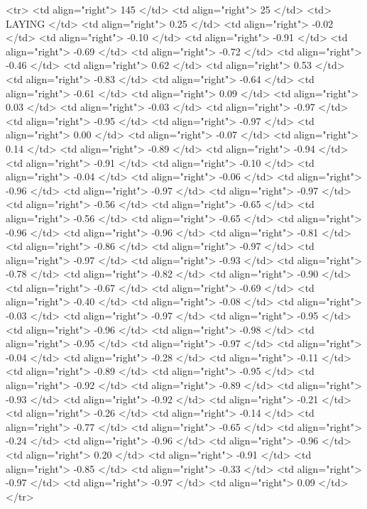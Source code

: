   <tr> <td align="right"> 145 </td> <td align="right">  25 </td> <td> LAYING </td> <td align="right"> 0.25 </td> <td align="right"> -0.02 </td> <td align="right"> -0.10 </td> <td align="right"> -0.91 </td> <td align="right"> -0.69 </td> <td align="right"> -0.72 </td> <td align="right"> -0.46 </td> <td align="right"> 0.62 </td> <td align="right"> 0.53 </td> <td align="right"> -0.83 </td> <td align="right"> -0.64 </td> <td align="right"> -0.61 </td> <td align="right"> 0.09 </td> <td align="right"> 0.03 </td> <td align="right"> -0.03 </td> <td align="right"> -0.97 </td> <td align="right"> -0.95 </td> <td align="right"> -0.97 </td> <td align="right"> 0.00 </td> <td align="right"> -0.07 </td> <td align="right"> 0.14 </td> <td align="right"> -0.89 </td> <td align="right"> -0.94 </td> <td align="right"> -0.91 </td> <td align="right"> -0.10 </td> <td align="right"> -0.04 </td> <td align="right"> -0.06 </td> <td align="right"> -0.96 </td> <td align="right"> -0.97 </td> <td align="right"> -0.97 </td> <td align="right"> -0.56 </td> <td align="right"> -0.65 </td> <td align="right"> -0.56 </td> <td align="right"> -0.65 </td> <td align="right"> -0.96 </td> <td align="right"> -0.96 </td> <td align="right"> -0.81 </td> <td align="right"> -0.86 </td> <td align="right"> -0.97 </td> <td align="right"> -0.97 </td> <td align="right"> -0.93 </td> <td align="right"> -0.78 </td> <td align="right"> -0.82 </td> <td align="right"> -0.90 </td> <td align="right"> -0.67 </td> <td align="right"> -0.69 </td> <td align="right"> -0.40 </td> <td align="right"> -0.08 </td> <td align="right"> -0.03 </td> <td align="right"> -0.97 </td> <td align="right"> -0.95 </td> <td align="right"> -0.96 </td> <td align="right"> -0.98 </td> <td align="right"> -0.95 </td> <td align="right"> -0.97 </td> <td align="right"> -0.04 </td> <td align="right"> -0.28 </td> <td align="right"> -0.11 </td> <td align="right"> -0.89 </td> <td align="right"> -0.95 </td> <td align="right"> -0.92 </td> <td align="right"> -0.89 </td> <td align="right"> -0.93 </td> <td align="right"> -0.92 </td> <td align="right"> -0.21 </td> <td align="right"> -0.26 </td> <td align="right"> -0.14 </td> <td align="right"> -0.77 </td> <td align="right"> -0.65 </td> <td align="right"> -0.24 </td> <td align="right"> -0.96 </td> <td align="right"> -0.96 </td> <td align="right"> 0.20 </td> <td align="right"> -0.91 </td> <td align="right"> -0.85 </td> <td align="right"> -0.33 </td> <td align="right"> -0.97 </td> <td align="right"> -0.97 </td> <td align="right"> 0.09 </td> </tr>
